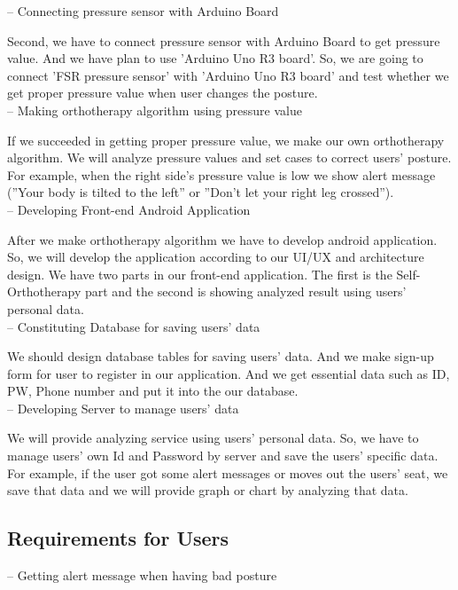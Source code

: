 \documentclass[conference]{IEEEtran}
\begin{document}
-- Connecting  pressure sensor with Arduino Board

Second, we have to connect pressure sensor with Arduino Board to get pressure value. And we have plan to use 'Arduino Uno R3 board'. So, we are going to connect 'FSR pressure sensor' with 'Arduino Uno R3 board' and test whether we get proper pressure value when user changes the posture. \\

-- Making orthotherapy algorithm using pressure value

If we succeeded in getting proper pressure value, we make our own orthotherapy algorithm. We will analyze pressure values and set cases to correct users' posture. For example, when the right side's pressure value is low we show alert message (''Your body is tilted to the left'' or ''Don't let your right leg crossed''). \\

-- Developing  Front-end Android Application

After we make orthotherapy algorithm we have to develop 
android application. So, we will develop the application according to our UI/UX and architecture design. We have two parts in our front-end application. The first is the Self-Orthotherapy part and the second is showing analyzed result using users' personal data.\\

-- Constituting Database for saving users' data

We should design database tables for saving users' data.
And we make sign-up form for user to register in our application. And we get essential data such as ID, PW, Phone number and put it into the our database. \\

-- Developing  Server to manage users' data

We will provide analyzing service using users' personal data. So, we have to manage users' own Id and Password by server and save the users' specific data. For example, if the user got some alert messages or moves out the users' seat, we save that data and we will provide graph or chart by analyzing that data.\\

\subsection{Requirements for Users}
-- Getting alert message when having bad posture
\end{document}
